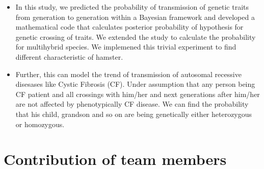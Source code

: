 \documentclass{article}
\begin{document}
\begin{itemize}
	
\item In this study, we predicted the probability of transmission of genetic traits from generation to generation within a Bayesian framework and developed a mathematical code that calculates posterior probability of hypothesis for genetic crossing of traits. We extended the study to calculate the probability for multihybrid species. We implemened this trivial experiment to find different characteristic of hamster.

\item Further, this can model the trend of transmission of autosomal recessive disesases like Cystic Fibrosis (CF). Under assumption that any person being CF patient and all crossings
with him/her and next generations after him/her are not affected by phenotypically CF disease. We can find the probability that his child, grandson and so on are being genetically either heterozygous or homozygous. 

\end{itemize} 

\section{ Contribution of team members}	
\end{document}

